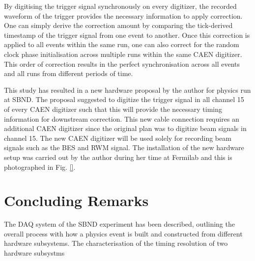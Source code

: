By digitising the trigger signal synchronously on every digitizer, the recorded waveform of the trigger provides the necessary information to apply correction.
One can simply derive the correction amount by comparing the tick-derived timestamp of the trigger signal from one event to another.
Once this correction is applied to all events within the same run, one can also correct for the random clock phase initialisation across multiple runs within the same CAEN digitizer.
This order of correction results in the perfect synchronisation across all events and all runs from different periods of time.

This study has resulted in a new hardware proposal by the author for physics run at SBND.
The proposal suggested to digitize the trigger signal in all channel 15 of every CAEN digitizer such that this will provide the necessary timing information for downstream correction.
This new cable connection requires an additional CAEN digitizer since the original plan was to digitize beam signals in channel 15.
The new CAEN digitizer will be used solely for recording beam signals such as the BES and RWM signal.
The installation of the new hardware setup was carried out by the author during her time at Fermilab and this is photographed in Fig. \ref {}.

\section{Concluding Remarks}
\label{section5.5}

The DAQ system of the SBND experiment has been described, outlining the overall process with how a physics event is built and constructed from different hardware subsystems.
The characterisation of the timing resolution of two hardware subsystms
